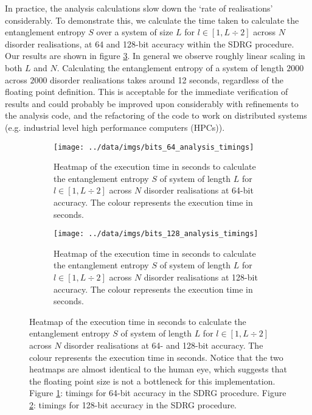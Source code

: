 In practice, the analysis calculations slow down the `rate of realisations' considerably. To demonstrate this, we calculate the time taken to calculate the entanglement entropy $S$ over a system of size $L$ for $l \in [1, L \div 2]$ across $N$ disorder realisations, at 64 and 128-bit accuracy within the SDRG procedure. Our results are shown in figure \ref{fig:analysis_timing_benchmarks}. In general we observe roughly linear scaling in both $L$ and $N$. Calculating the entanglement entropy of a system of length $2000$ across $2000$ disorder realisations takes around 12 seconds, regardless of the floating point definition. This is acceptable for the immediate verification of results and could probably be improved upon considerably with refinements to the analysis code, and the refactoring of the code to work on distributed systems (e.g. industrial level high performance computers (HPCs)).

\begin{figure}
     \centering
     \begin{subfigure}[b]{0.8\textwidth}
   \centering
    \texttt{[image: ../data/imgs/bits\_64\_analysis\_timings]}
    \caption{Heatmap of the execution time in seconds to calculate the entanglement entropy $S$ of system of length $L$ for $l \in [1, L \div 2]$ across $N$ disorder realisations at 64-bit accuracy. The colour represents the execution time in seconds.}
    \label{fig:analysis_64bit_timings}
\end{subfigure}%
     \hfill
     \begin{subfigure}[b]{0.8\textwidth}
         \centering
    \texttt{[image: ../data/imgs/bits\_128\_analysis\_timings]}
    \caption{Heatmap of the execution time in seconds to calculate the entanglement entropy $S$ of system of length $L$ for $l \in [1, L \div 2]$ across $N$ disorder realisations at 128-bit accuracy. The colour represents the execution time in seconds.}
    \label{fig:analysis_128bit_timings}
     \end{subfigure}
            \caption{Heatmap of the execution time in seconds to calculate the entanglement entropy $S$ of system of length $L$ for $l \in [1, L \div 2]$ across $N$ disorder realisations at 64- and 128-bit accuracy. The colour represents the execution time in seconds. Notice that the two heatmaps are almost identical to the human eye, which suggests that the floating point size is not a bottleneck for this implementation. Figure \ref{fig:analysis_64bit_timings}: timings for 64-bit accuracy in the SDRG procedure. Figure \ref{fig:analysis_128bit_timings}: timings for 128-bit accuracy in the SDRG procedure.}
        \label{fig:analysis_timing_benchmarks}
\end{figure}



